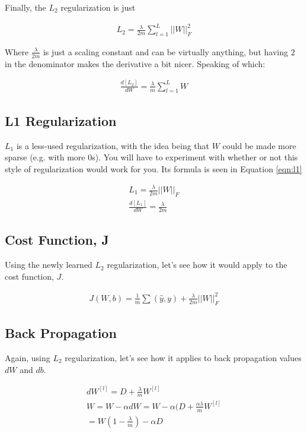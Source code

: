 \documentclass{article}
\begin{document}
Finally, the $L_{2}$ regularization is just

\begin{gather}
L_{2} = \frac{\lambda}{2m} \sum_{l=1}^{L} ||W||_{F}^{2}
\end{gather}

Where $\frac{\lambda}{2m}$ is just a scaling constant and can be virtually anything, but having $2$ in the denominator makes the derivative a bit nicer.  Speaking of which:

\begin{gather}
\frac{d[L_{2}]}{dW} = \frac{\lambda}{m} \sum_{l=1}^{L} W
\end{gather}

\subsection{L1 Regularization}

$L_{1}$ is a less-used regularization, with the idea being that $W$ could be made more sparse (e.g. with more 0s).  You will have to experiment with whether or not this style of regularization would work for you.  Its formula is seen in Equation \ref{eqn:l1}

\begin{gather} \label{eqn:l1}
L_{1} = \frac{\lambda}{2m} ||W||_{F} \\
\frac{d[L_{1}]}{dW} = \frac{\lambda}{2m}
\end{gather}

\subsection{Cost Function, J}

Using the newly learned $L_2$ regularization, let's see how it would apply to the cost function, $J$.

\begin{gather}
J(W, b) = \frac{1}{m} \sum(\hat{y}, y) + \frac{\lambda}{2m} ||W||_{F}^{2}
\end{gather}

\subsection{Back Propagation}

Again, using $L_2$ regularization, let's see how it applies to back propagation values $dW$ and $db$.

\begin{gather}
dW^{[l]} = D + \frac{\lambda}{m} W^{[l]} \\
W = W - \alpha dW = W - \alpha (D + \frac{\alpha \lambda}{m} W^{[l]} \\
= W(1 - \frac{\lambda}{m}) - \alpha D
\end{gather}
\end{document}

